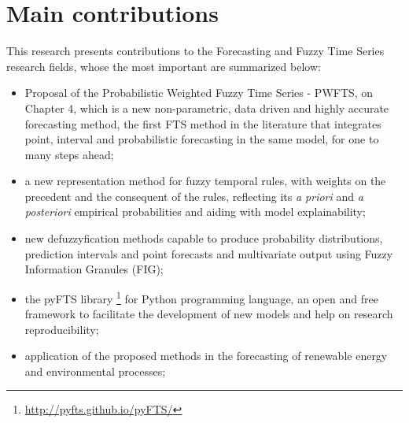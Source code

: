 \section{Main contributions} 

This research presents contributions to the Forecasting and Fuzzy Time Series research fields, whose the most important are summarized below:

\begin{itemize}
    \item Proposal of the Probabilistic Weighted Fuzzy Time Series - PWFTS, on Chapter 4, which is a new non-parametric, data driven and highly accurate forecasting method, the first FTS method in the literature that integrates point, interval and probabilistic forecasting in the same model, for one to many steps ahead;
    \item a new representation method for fuzzy temporal rules, with weights on the precedent and the consequent of the rules, reflecting its \textit{a priori} and \textit{a posteriori} empirical probabilities and aiding with model explainability;
    \item new defuzzyfication methods capable to produce probability distributions, prediction intervals and point forecasts and multivariate output using Fuzzy Information Granules (FIG);
    \item the pyFTS library \cite{pyFTS}\footnote{\url{http://pyfts.github.io/pyFTS/}} for Python programming language, an open and free framework to facilitate the development of new models and help on research reproducibility;  
    \item application of the proposed methods in the forecasting of renewable energy and environmental processes;
\end{itemize}


